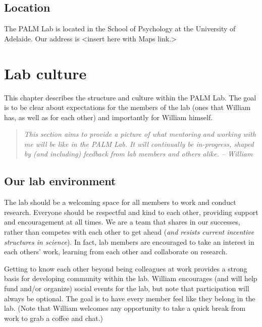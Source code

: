 \documentclass[
]{book}
\begin{document}
\hypertarget{location}{%
\section{Location}\label{location}}

The PALM Lab is located in the School of Psychology at the University of Adelaide. Our address is \textless insert here with Maps link.\textgreater{}

\hypertarget{lab-culture}{%
\chapter{Lab culture}\label{lab-culture}}

This chapter describes the structure and culture within the PALM Lab. The goal is to be clear about expectations for the members of the lab (ones that William has, as well as for each other) and importantly for William himself.

\begin{quote}
\emph{This section aims to provide a picture of what mentoring and working with me will be like in the PALM Lab. It will continually be in-progress, shaped by (and including) feedback from lab members and others alike. -- William}
\end{quote}

\hypertarget{lab-environment}{%
\section{Our lab environment}\label{lab-environment}}

The lab should be a welcoming space for all members to work and conduct research. Everyone should be respectful and kind to each other, providing support and encouragement at all times. We are a team that shares in our successes, rather than competes with each other to get ahead (\emph{and resists current incentive structures in science}). In fact, lab members are encouraged to take an interest in each others' work, learning from each other and collaborate on research.

Getting to know each other beyond being colleagues at work provides a strong basis for developing community within the lab. William encourages (and will help fund and/or organize) social events for the lab, but note that participation will always be optional. The goal is to have every member feel like they belong in the lab. (Note that William welcomes any opportunity to take a quick break from work to grab a coffee and chat.)
\end{document}
